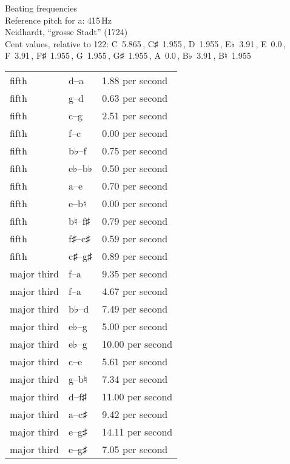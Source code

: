 \documentclass{standalone}
\def\str{\textquotesingle}
\def\cn{\textcent}
\begin{document}
\begin{minipage}{8cm}
\begin{center}
  {\Large Beating frequencies}\\[2ex]
  Reference pitch for a\str: 415\,Hz\\[1ex]
  Neidhardt, \enquote{grosse Stadt} (1724)\\[1ex]
  Cent values, relative to 122: C~5.865\,\cn, C♯~1.955\,\cn, D~1.955\,\cn, E♭~3.91\,\cn, E~0.0\,\cn, F~3.91\,\cn, F♯~1.955\,\cn, G~1.955\,\cn, G♯~1.955\,\cn, A~0.0\,\cn, B♭~3.91\,\cn, B♮~1.955\,\cn
\end{center}
\begin{longtable}{p{2cm}p{1cm}p{3cm}}
  \toprule
  fifth & d\str--a\str & 1.88 per second \\fifth & g--d\str & 0.63 per second \\fifth & c\str--g\str & 2.51 per second \\fifth & f--c\str & 0.00 per second \\fifth & b♭--f\str & 0.75 per second \\fifth & e♭--b♭ & 0.50 per second \\fifth & a--e\str & 0.70 per second \\fifth & e--b♮ & 0.00 per second \\fifth & b♮--f♯\str & 0.79 per second \\fifth & f♯--c♯\str & 0.59 per second \\fifth & c♯\str--g♯\str & 0.89 per second \\major third & f\str--a\str & 9.35 per second \\major third & f--a & 4.67 per second \\major third & b♭--d\str & 7.49 per second \\major third & e♭--g & 5.00 per second \\major third & e♭\str--g\str & 10.00 per second \\major third & c\str--e\str & 5.61 per second \\major third & g--b♮ & 7.34 per second \\major third & d\str--f♯\str & 11.00 per second \\major third & a--c♯\str & 9.42 per second \\major third & e\str--g♯\str & 14.11 per second \\major third & e--g♯ & 7.05 per second \\
  \bottomrule
\end{longtable}
\end{minipage}
\end{document}
